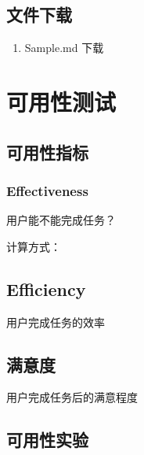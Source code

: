 \documentclass[letterpaper,10pt,english]{sphinxmanual}
\begin{document}
\section{文件下载}
\label{\detokenize{doc-quality/Vale:id8}}\begin{enumerate}
%
\item {} 
\sphinxAtStartPar
Sample.md 下载

\end{enumerate}

\sphinxstepscope


\chapter{可用性测试}
\label{\detokenize{content_test/usability_testing:id1}}\label{\detokenize{content_test/usability_testing::doc}}

\section{可用性指标}
\label{\detokenize{content_test/usability_testing:id2}}

\subsection{Effectiveness}
\label{\detokenize{content_test/usability_testing:effectiveness}}
\sphinxAtStartPar
用户能不能完成任务？

\sphinxAtStartPar
计算方式：


\section{Efficiency}
\label{\detokenize{content_test/usability_testing:efficiency}}
\sphinxAtStartPar
用户完成任务的效率


\section{满意度}
\label{\detokenize{content_test/usability_testing:id3}}
\sphinxAtStartPar
用户完成任务后的满意程度


\section{可用性实验}
\label{\detokenize{content_test/usability_testing:id4}}
\end{document}
